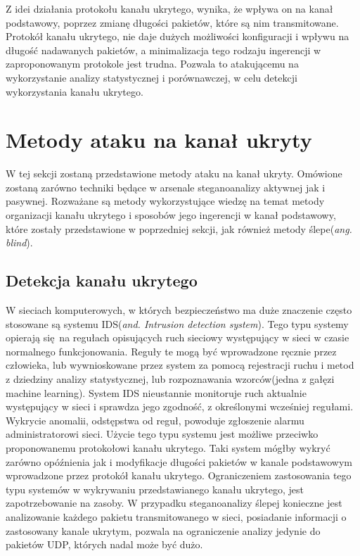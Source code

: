 \documentclass[a4paper, twoside, 12pt]{report}
\begin{document}
        Z idei działania protokołu kanału ukrytego, wynika, że wpływa on na kanał
        podstawowy, poprzez zmianę długości pakietów, które są nim transmitowane.
        Protokół kanału ukrytego, nie daje dużych możliwości konfiguracji i wpływu
        na długość nadawanych pakietów, a minimalizacja tego rodzaju ingerencji
        w zaproponowanym protokole jest trudna. Pozwala to atakującemu
        na wykorzystanie analizy statystycznej i porównawczej, w celu detekcji
        wykorzystania kanału ukrytego.

    \section{Metody ataku na kanał ukryty}
       W tej sekcji zostaną przedstawione metody ataku na kanał ukryty. Omówione
       zostaną zarówno techniki będące w arsenale steganoanalizy aktywnej jak i
       pasywnej. Rozważane są metody wykorzystujące wiedzę na temat metody organizacji kanału ukrytego
       i sposobów jego ingerencji w kanał podstawowy, które zostały przedstawione w poprzedniej sekcji,
       jak również metody ślepe(\emph{ang. blind}).

       \subsection{Detekcja kanału ukrytego}
       W sieciach komputerowych, w których bezpieczeństwo ma duże znaczenie często
       stosowane są systemu IDS(\emph{and. Intrusion detection system}). Tego typu
       systemy opierają się na regułach opisujących ruch sieciowy występujący w
       sieci w czasie normalnego funkcjonowania. Reguły te mogą być wprowadzone ręcznie
       przez człowieka, lub wywnioskowane przez system za pomocą rejestracji ruchu i metod z dziedziny
       analizy statystycznej, lub rozpoznawania wzorców(jedna z gałęzi machine learning)\cite{IDSDESCRIPTION}.
       System IDS nieustannie monitoruje ruch aktualnie występujący w sieci i sprawdza
       jego zgodność, z określonymi wcześniej regułami. Wykrycie anomalii, odstępstwa
       od reguł, powoduje zgłoszenie alarmu administratorowi sieci. Użycie tego
       typu systemu jest możliwe przeciwko proponowanemu protokołowi kanału ukrytego.
       Taki system mógłby wykryć zarówno opóźnienia jak i modyfikacje długości
       pakietów w kanale podstawowym wprowadzone przez protokół kanału ukrytego.
       Ograniczeniem zastosowania tego typu systemów w wykrywaniu przedstawianego kanału
       ukrytego, jest zapotrzebowanie na zasoby. W przypadku steganoanalizy ślepej
       konieczne jest analizowanie każdego pakietu transmitowanego w sieci, posiadanie
       informacji o zastosowany kanale ukrytym, pozwala na ograniczenie analizy jedynie
       do pakietów UDP, których nadal może być dużo.
\end{document}
